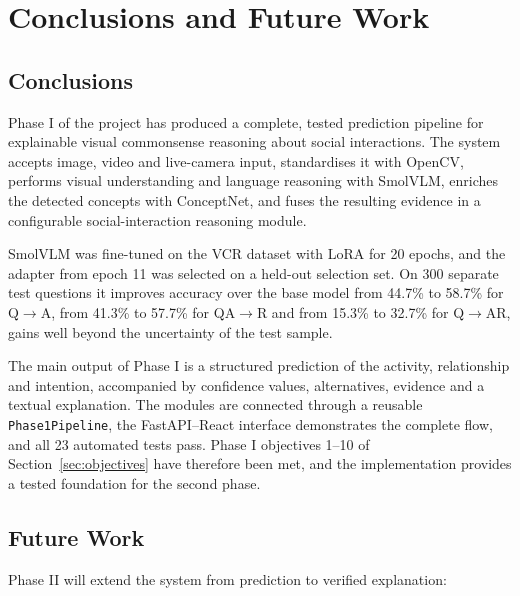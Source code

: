 \documentclass[12pt,a4paper,oneside]{report}
\newcommand{\QtoA}{Q$\rightarrow$A}
\newcommand{\QAtoR}{QA$\rightarrow$R}
\newcommand{\QtoAR}{Q$\rightarrow$AR}
\newcommand{\code}[1]{\texttt{#1}}
\begin{document}
\chapter{Conclusions and Future Work}
\label{ch:conclusion}

\section{Conclusions}

Phase I of the project has produced a complete, tested prediction pipeline for
explainable visual commonsense reasoning about social interactions. The system
accepts image, video and live-camera input, standardises it with OpenCV,
performs visual understanding and language reasoning with SmolVLM, enriches the
detected concepts with ConceptNet, and fuses the resulting evidence in a
configurable social-interaction reasoning module.

SmolVLM was fine-tuned on the VCR dataset with LoRA for 20 epochs, and the
adapter from epoch 11 was selected on a held-out selection set. On 300 separate
test questions it improves accuracy over the base model from 44.7\% to 58.7\%
for \QtoA, from 41.3\% to 57.7\% for \QAtoR{} and from 15.3\% to 32.7\% for
\QtoAR, gains well beyond the uncertainty of the test sample.

The main output of Phase I is a structured prediction of the activity,
relationship and intention, accompanied by confidence values, alternatives,
evidence and a textual explanation. The modules are connected through a
reusable \code{Phase1Pipeline}, the FastAPI--React interface demonstrates the
complete flow, and all 23 automated tests pass. Phase I objectives 1--10 of
Section~\ref{sec:objectives} have therefore been met, and the implementation
provides a tested foundation for the second phase.

\section{Future Work}

Phase II will extend the system from prediction to verified explanation:
\end{document}
